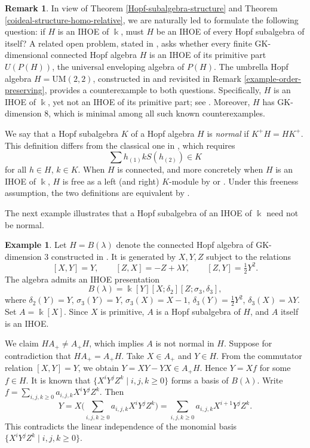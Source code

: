 \documentclass{article}
\theoremstyle{plain}
\theoremstyle{definition}
\newtheorem{remark}[thm]{Remark}
\newtheorem{example}[thm]{Example}
\numberwithin{equation}{section}
\begin{document}
	\begin{remark}
		In view of Theorem \ref{Hopf-subalgebra-structure} and Theorem \ref{coideal-structure-homo-relative}, we are naturally led to formulate the following question: if $H$ is an IHOE of $\Bbbk$, must $H$ be an IHOE of every Hopf subalgebra of itself? A related open problem, stated in \cite[Question C]{LZ23}, asks whether every finite GK-dimensional connected Hopf algebra $H$ is an IHOE of its primitive part $U(P(H))$, the universal enveloping algebra of $P(H)$. The umbrella Hopf algebra $H=\mathrm{UM}(2,2)$, constructed in \cite{HW26} and revisited in Remark \ref{example-order-preserving}, provides a counterexample to both questions. Specifically, $H$ is an IHOE of $\Bbbk$, yet not an IHOE of its primitive part; see \cite[Corollary 4.5]{HW26}. Moreover, $H$ has GK-dimension $8$, which is minimal among all such known counterexamples.
	\end{remark}
	
	We say that a Hopf subalgebra $K$ of a Hopf algebra $H$ is \emph{normal} if $K^{+}H = HK^{+}$. This definition differs from the classical one in \cite[Definition 3.4.1]{Mo93}, which requires
	\[
	\sum h_{(1)} k S(h_{(2)}) \in K
	\]
	for all $h \in H$, $k \in K$. When $H$ is connected, and more concretely when $H$ is an IHOE of $\Bbbk$, $H$ is free as a left (and right) $K$-module by \cite[Corollary 3.4]{LZ23} or \cite[Theorem 4]{RA77}. Under this freeness assumption, the two definitions are equivalent by \cite[Lemma 3.4.2, Proposition 3.4.3]{Mo93}.
	
	The next example illustrates that a Hopf subalgebra of an IHOE of $\Bbbk$ need not be normal.
	
	\begin{example}
		Let $H=B(\lambda)$ denote the connected Hopf algebra of GK-dimension $3$ constructed in \cite{Zh13}. It is generated by $X,Y,Z$ subject to the relations
		\[
		[X,Y]=Y,\qquad [Z,X]=-Z+\lambda Y,\qquad [Z,Y]=\tfrac12 Y^{2}.
		\]
		The algebra admits an IHOE presentation
		\[
		B(\lambda)=\Bbbk[Y][X;\delta_{2}][Z;\sigma_{3},\delta_{3}],
		\]
		where $\delta_{2}(Y)=Y$, $\sigma_{3}(Y)=Y$, $\sigma_{3}(X)=X-1$, $\delta_{3}(Y)=\tfrac12 Y^{2}$, $\delta_{3}(X)=\lambda Y$.
		Set $A = \Bbbk[X]$. Since $X$ is primitive, $A$ is a Hopf subalgebra of $H$, and $A$ itself is an IHOE.
		
		We claim $HA_{+}\neq A_{+}H$, which implies $A$ is not normal in $H$. Suppose for contradiction that $HA_{+}=A_{+}H$.
		Take $X\in A_{+}$ and $Y\in H$. From the commutator relation $[X,Y]=Y$, we obtain $Y=XY-YX\in A_{+}H$. Hence $Y = Xf$ for some $f\in H$. It is known that $\{X^{i}Y^{j}Z^{k} \mid i,j,k\geq 0\}$ forms a basis of $B(\lambda)$. Write $f=\sum_{i,j,k\geq 0} a_{i,j,k} X^{i}Y^{j}Z^{k}$. Then
		\[
		Y=  X\biggl(\sum_{i,j,k\geq 0} a_{i,j,k} X^{i}Y^{j}Z^{k}\biggr)
		=\sum_{i,j,k\geq 0} a_{i,j,k} X^{i+1}Y^{j}Z^{k}.
		\]
		This contradicts the linear independence of the monomial basis $\{X^{i}Y^{j}Z^{k}\mid i,j,k\ge 0\}$.
	\end{example}
	
\end{document}
